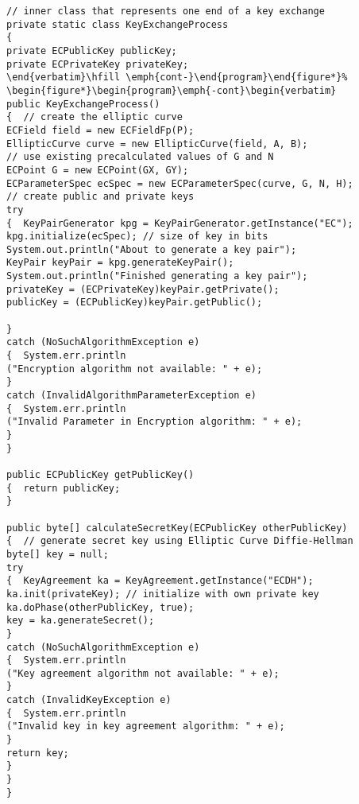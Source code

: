\begin{lstlisting}[caption=ECC key exchange]
// inner class that represents one end of a key exchange
private static class KeyExchangeProcess
{
private ECPublicKey publicKey;
private ECPrivateKey privateKey;
\end{verbatim}\hfill \emph{cont-}\end{program}\end{figure*}%
\begin{figure*}\begin{program}\emph{-cont}\begin{verbatim}
public KeyExchangeProcess()
{  // create the elliptic curve
ECField field = new ECFieldFp(P);
EllipticCurve curve = new EllipticCurve(field, A, B);
// use existing precalculated values of G and N
ECPoint G = new ECPoint(GX, GY);
ECParameterSpec ecSpec = new ECParameterSpec(curve, G, N, H);
// create public and private keys
try
{  KeyPairGenerator kpg = KeyPairGenerator.getInstance("EC");
kpg.initialize(ecSpec); // size of key in bits
System.out.println("About to generate a key pair");
KeyPair keyPair = kpg.generateKeyPair();
System.out.println("Finished generating a key pair");
privateKey = (ECPrivateKey)keyPair.getPrivate();
publicKey = (ECPublicKey)keyPair.getPublic();

}
catch (NoSuchAlgorithmException e)
{  System.err.println
("Encryption algorithm not available: " + e);
}
catch (InvalidAlgorithmParameterException e)
{  System.err.println
("Invalid Parameter in Encryption algorithm: " + e);
}
}

public ECPublicKey getPublicKey()
{  return publicKey;
}

public byte[] calculateSecretKey(ECPublicKey otherPublicKey)
{  // generate secret key using Elliptic Curve Diffie-Hellman
byte[] key = null;
try
{  KeyAgreement ka = KeyAgreement.getInstance("ECDH");
ka.init(privateKey); // initialize with own private key
ka.doPhase(otherPublicKey, true);
key = ka.generateSecret();
}
catch (NoSuchAlgorithmException e)
{  System.err.println
("Key agreement algorithm not available: " + e);
}
catch (InvalidKeyException e)
{  System.err.println
("Invalid key in key agreement algorithm: " + e);
}
return key;
}
}
}
\end{lstlisting}
